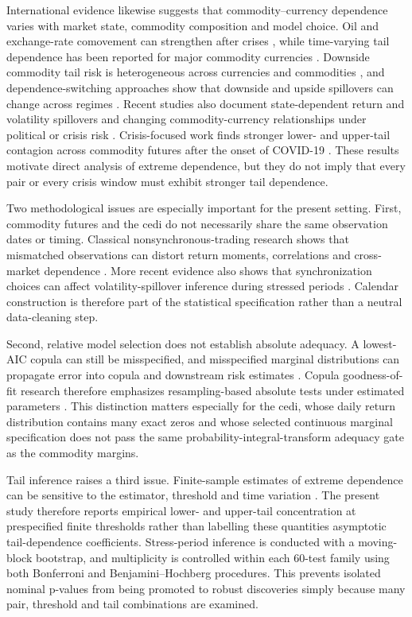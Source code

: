 International evidence likewise suggests that commodity--currency dependence varies with market state, commodity composition and model choice. Oil and exchange-rate comovement can strengthen after crises \citep{reboredo2012}, while time-varying tail dependence has been reported for major commodity currencies \citep{ignatieva2017}. Downside commodity tail risk is heterogeneous across currencies and commodities \citep{bondatti2022}, and dependence-switching approaches show that downside and upside spillovers can change across regimes \citep{ning2025}. Recent studies also document state-dependent return and volatility spillovers and changing commodity-currency relationships under political or crisis risk \citep{go2024,dodd2026}. Crisis-focused work finds stronger lower- and upper-tail contagion across commodity futures after the onset of COVID-19 \citep{qiao2023}. These results motivate direct analysis of extreme dependence, but they do not imply that every pair or every crisis window must exhibit stronger tail dependence.

Two methodological issues are especially important for the present setting. First, commodity futures and the cedi do not necessarily share the same observation dates or timing. Classical nonsynchronous-trading research shows that mismatched observations can distort return moments, correlations and cross-market dependence \citep{scholes1977,lo1990,martens2001,schotman2006}. More recent evidence also shows that synchronization choices can affect volatility-spillover inference during stressed periods \citep{dimitriou2025}. Calendar construction is therefore part of the statistical specification rather than a neutral data-cleaning step.

Second, relative model selection does not establish absolute adequacy. A lowest-AIC copula can still be misspecified, and misspecified marginal distributions can propagate error into copula and downstream risk estimates \citep{fantazzini2009}. Copula goodness-of-fit research therefore emphasizes resampling-based absolute tests under estimated parameters \citep{dobric2007,genest2008,genest2009}. This distinction matters especially for the cedi, whose daily return distribution contains many exact zeros and whose selected continuous marginal specification does not pass the same probability-integral-transform adequacy gate as the commodity margins.

Tail inference raises a third issue. Finite-sample estimates of extreme dependence can be sensitive to the estimator, threshold and time variation \citep{frahm2005,supper2020}. The present study therefore reports empirical lower- and upper-tail concentration at prespecified finite thresholds rather than labelling these quantities asymptotic tail-dependence coefficients. Stress-period inference is conducted with a moving-block bootstrap, and multiplicity is controlled within each 60-test family using both Bonferroni and Benjamini--Hochberg procedures. This prevents isolated nominal p-values from being promoted to robust discoveries simply because many pair, threshold and tail combinations are examined.

